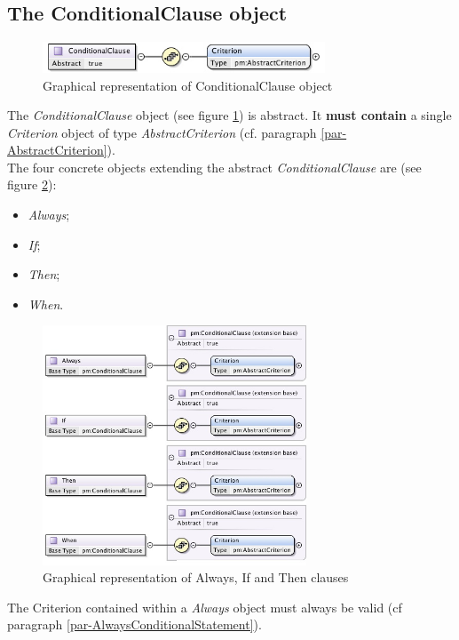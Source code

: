 \documentclass[a4paper,11pt] {ivoa}
\begin{document}
\subsection{The ConditionalClause object}\label{par-ConditionalClause}
\begin{figure}[htbp]
\begin{center}
\includegraphics[width=0.75\textwidth]{pictures/ConditionalClause.jpg} 
\caption{Graphical representation of ConditionalClause object}
\label{Pic-ConditionalClause}
\end{center}
\end{figure}
The {\it ConditionalClause} object (see figure \ref{Pic-ConditionalClause}) is abstract. It {\bf
must contain} a single {\it Criterion} object of type {\it AbstractCriterion} (cf. paragraph
\ref{par-AbstractCriterion}).\\
The four concrete objects extending the abstract {\it ConditionalClause} are (see figure
\ref{Pic-ConcreteClause}):
\begin{itemize}
\item {\it Always};
\item {\it If};
\item {\it Then};
\item {\it When}.
\end{itemize}
\begin{figure}[htbp]
\begin{center}
\includegraphics[width=0.7\textwidth]{pictures/ConcreteClauses.jpg} 
\caption{Graphical representation of Always, If and Then clauses}
\label{Pic-ConcreteClause}
\end{center}
\end{figure}
The Criterion contained within a {\it Always} object must always be valid (cf paragraph
\ref{par-AlwaysConditionalStatement}).\\
\end{document}
